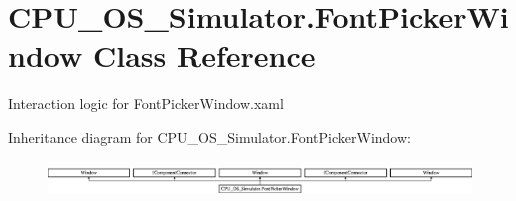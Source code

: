 \hypertarget{class_c_p_u___o_s___simulator_1_1_font_picker_window}{}\section{C\+P\+U\+\_\+\+O\+S\+\_\+\+Simulator.\+Font\+Picker\+Window Class Reference}
\label{class_c_p_u___o_s___simulator_1_1_font_picker_window}


Interaction logic for Font\+Picker\+Window.\+xaml  


Inheritance diagram for C\+P\+U\+\_\+\+O\+S\+\_\+\+Simulator.\+Font\+Picker\+Window\+:\begin{figure}[H]
\begin{center}
\leavevmode
\includegraphics[height=0.941176cm]{class_c_p_u___o_s___simulator_1_1_font_picker_window}
\end{center}
\end{figure}
